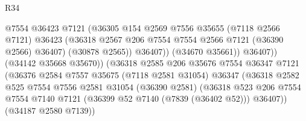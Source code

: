 \begin{lexlean}{R34}
\begin{coremodule}
                                          @7554
                                          @36423
                                          @7121
                                          (@36305
                                            @154
                                            @2569
                                            @7556
                                            @35655
                                            (@7118 @2566 @7121)
                                            @36423
                                            (@36318
                                              @2567
                                              @206
                                              @7554
                                              @7554
                                              @2566
                                              @7121
                                              (@36390 @2566)
                                              @36407)
                                            (@30878 @2565))
                                          @36407))
                                      (@34670 @35661))
                                    @36407))
                                (@34142 @35668 @35670))
                              (@36318
                                @2585
                                @206
                                @35676
                                @7554
                                @36347
                                @7121
                                (@36376
                                  @2584
                                  @7557
                                  @35675
                                  (@7118 @2581 @31054)
                                  @36347
                                  (@36318
                                    @2582
                                    @525
                                    @7554
                                    @7556
                                    @2581
                                    @31054
                                    (@36390 @2581)
                                    (@36318
                                      @523
                                      @206
                                      @7554
                                      @7554
                                      @7140
                                      @7121
                                      (@36399 @52 @7140 (@7839 (@36402 @52)))
                                      @36407))
                                  (@34187 @2580 @7139))

\end{coremodule}
\end{lexlean}
